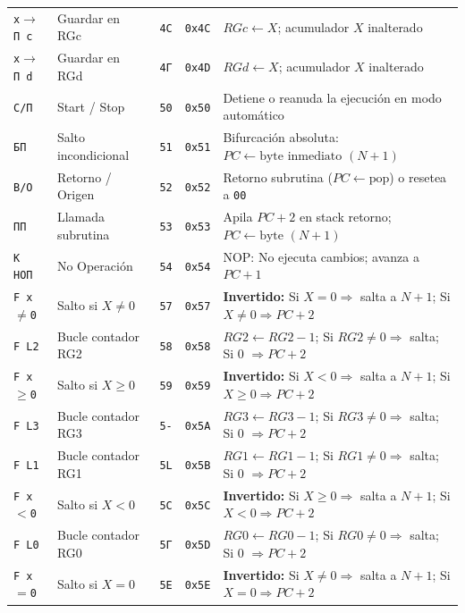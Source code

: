 \documentclass[11pt,a4paper]{article}
\begin{document}
{\begin{longtable}{p{2.2cm}p{3.0cm}>{\centering\arraybackslash}p{1.0cm}>{\centering\arraybackslash}p{1.2cm}p{7.3cm}}
\texttt{x$\to$П c} & Guardar en RGc & \texttt{4C} & \texttt{0x4C} & $RGc \leftarrow X$; acumulador $X$ inalterado \\
\texttt{x$\to$П d} & Guardar en RGd & \texttt{4Г} & \texttt{0x4D} & $RGd \leftarrow X$; acumulador $X$ inalterado \\
\midrule
\texttt{С/П} & Start / Stop & \texttt{50} & \texttt{0x50} & Detiene o reanuda la ejecución en modo automático \\
\texttt{БП} & Salto incondicional & \texttt{51} & \texttt{0x51} & Bifurcación absoluta: $PC \leftarrow \text{byte inmediato } (N+1)$ \\
\texttt{В/О} & Retorno / Origen & \texttt{52} & \texttt{0x52} & Retorno subrutina ($PC \leftarrow \text{pop}$) o resetea a \texttt{00} \\
\texttt{ПП} & Llamada subrutina & \texttt{53} & \texttt{0x53} & Apila $PC+2$ en stack retorno; $PC \leftarrow \text{byte } (N+1)$ \\
\texttt{K НОП} & No Operación & \texttt{54} & \texttt{0x54} & NOP: No ejecuta cambios; avanza a $PC+1$ \\
\texttt{F x$\ne$0} & Salto si $X \ne 0$ & \texttt{57} & \texttt{0x57} & \textbf{Invertido:} Si $X = 0 \Rightarrow$ salta a $N+1$; Si $X \ne 0 \Rightarrow PC+2$ \\
\texttt{F L2} & Bucle contador RG2 & \texttt{58} & \texttt{0x58} & $RG2 \leftarrow RG2-1$; Si $RG2 \ne 0 \Rightarrow$ salta; Si 0 $\Rightarrow PC+2$ \\
\texttt{F x$\ge$0} & Salto si $X \ge 0$ & \texttt{59} & \texttt{0x59} & \textbf{Invertido:} Si $X < 0 \Rightarrow$ salta a $N+1$; Si $X \ge 0 \Rightarrow PC+2$ \\
\texttt{F L3} & Bucle contador RG3 & \texttt{5-} & \texttt{0x5A} & $RG3 \leftarrow RG3-1$; Si $RG3 \ne 0 \Rightarrow$ salta; Si 0 $\Rightarrow PC+2$ \\
\texttt{F L1} & Bucle contador RG1 & \texttt{5L} & \texttt{0x5B} & $RG1 \leftarrow RG1-1$; Si $RG1 \ne 0 \Rightarrow$ salta; Si 0 $\Rightarrow PC+2$ \\
\texttt{F x$<$0} & Salto si $X < 0$ & \texttt{5C} & \texttt{0x5C} & \textbf{Invertido:} Si $X \ge 0 \Rightarrow$ salta a $N+1$; Si $X < 0 \Rightarrow PC+2$ \\
\texttt{F L0} & Bucle contador RG0 & \texttt{5Г} & \texttt{0x5D} & $RG0 \leftarrow RG0-1$; Si $RG0 \ne 0 \Rightarrow$ salta; Si 0 $\Rightarrow PC+2$ \\
\texttt{F x$=$0} & Salto si $X = 0$ & \texttt{5E} & \texttt{0x5E} & \textbf{Invertido:} Si $X \ne 0 \Rightarrow$ salta a $N+1$; Si $X = 0 \Rightarrow PC+2$ \\

\end{longtable}}
\end{document}
